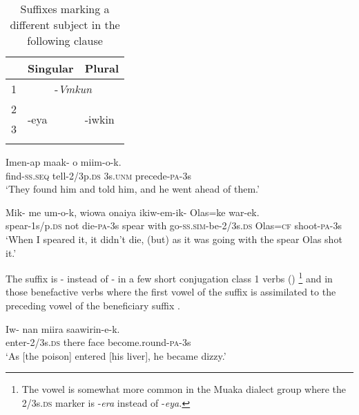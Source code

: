 \begin{table}
\caption{Suffixes marking a different subject in the following clause}
\label{tab:3:differentsubject}

\begin{tabular}{lll}
\mytoprule
 & Singular & Plural\\
\midrule 
1 & \multicolumn{2}{c}{-\textit{Vmkun}}\\
2 & \multirow{2}{*}{-eya} & \multirow{2}{*}{-iwkin}\\
3 & & \\ 
\mybottomrule 
\end{tabular}

\end{table}

\ea%
\label{ex:3:x244}
\gll Imen-ap maak- o miim-o-k. \\
find-\textsc{ss}.\textsc{seq} tell-2/3p.\textsc{ds} 3s.\textsc{unm} precede-\textsc{pa}-3s \\
\glt`They found him and told him, and he went ahead of them.' 
\z

\ea%
\label{ex:3:x245}
\gll Mik- me um-o-k, wiowa onaiya ikiw-em-ik- Olas=ke war-ek.\\
spear-1s/p.\textsc{ds} not die-\textsc{pa}-3s spear with go-\textsc{ss}.\textsc{sim}-be-2/3s.\textsc{ds} Olas=\textsc{cf} shoot-\textsc{pa}-3s\\
\glt`When I speared it, it didn't die, (but) as it was going with the spear Olas shot it.'
\z

The suffix is - instead of \nobreakdash- in a few short conjugation class 1 verbs () \footnote{The vowel  is somewhat more common in the Muaka dialect group where the 2/3s.\textsc{ds} marker is -\textit{era} instead of \nobreakdash-\textit{eya.}} and in those benefactive verbs where the first vowel of the suffix is assimilated to the preceding vowel of the beneficiary suffix . 

\ea%
\label{ex:3:x493}
\gll Iw- nan miira saawirin-e-k. \\
enter-2/3s.\textsc{ds} there face become.round-\textsc{pa}-3s\\
\glt`As [the poison] entered [his liver], he became dizzy.'
\z


